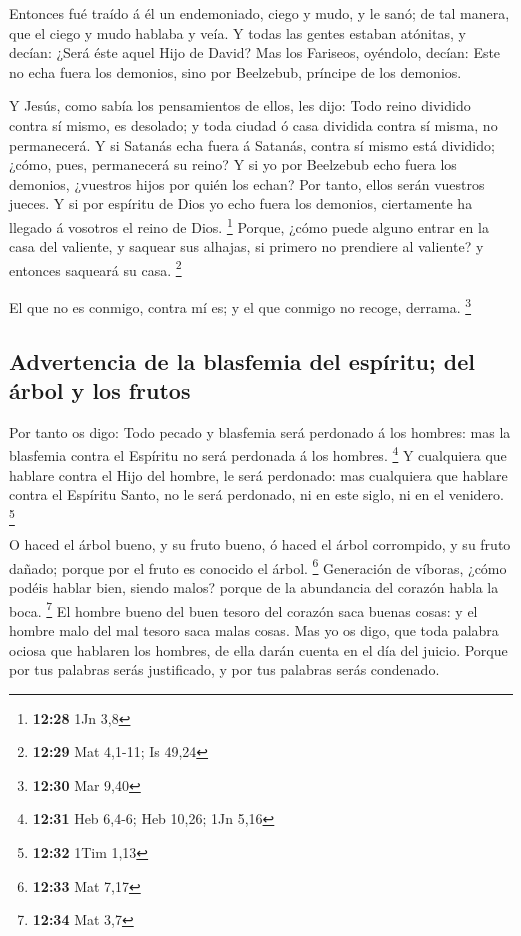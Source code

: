  Entonces fué traído á él un endemoniado, ciego y mudo, y
le sanó; de tal manera, que el ciego y mudo hablaba y veía.
 Y todas las gentes estaban atónitas, y decían: ¿Será
éste aquel Hijo de David?  Mas los Fariseos, oyéndolo,
decían: Este no echa fuera los demonios, sino por Beelzebub, príncipe de
los demonios.

 Y Jesús, como sabía los pensamientos de ellos, les dijo:
Todo reino dividido contra sí mismo, es desolado; y toda ciudad ó casa
dividida contra sí misma, no permanecerá.  Y si Satanás
echa fuera á Satanás, contra sí mismo está dividido; ¿cómo, pues,
permanecerá su reino?  Y si yo por Beelzebub echo fuera
los demonios, ¿vuestros hijos por quién los echan? Por tanto, ellos
serán vuestros jueces.  Y si por espíritu de Dios yo echo
fuera los demonios, ciertamente ha llegado á vosotros el reino de Dios.
\footnote{\textbf{12:28} 1Jn 3,8}  Porque, ¿cómo puede
alguno entrar en la casa del valiente, y saquear sus alhajas, si primero
no prendiere al valiente? y entonces saqueará su casa. \footnote{\textbf{12:29}
  Mat 4,1-11; Is 49,24}

 El que no es conmigo, contra mí es; y el que conmigo no
recoge, derrama. \footnote{\textbf{12:30} Mar 9,40}

\hypertarget{advertencia-de-la-blasfemia-del-espuxedritu-del-uxe1rbol-y-los-frutos}{%
\subsection{Advertencia de la blasfemia del espíritu; del árbol y los
frutos}\label{advertencia-de-la-blasfemia-del-espuxedritu-del-uxe1rbol-y-los-frutos}}

 Por tanto os digo: Todo pecado y blasfemia será
perdonado á los hombres: mas la blasfemia contra el Espíritu no será
perdonada á los hombres. \footnote{\textbf{12:31} Heb 6,4-6; Heb 10,26;
  1Jn 5,16}  Y cualquiera que hablare contra el Hijo del
hombre, le será perdonado: mas cualquiera que hablare contra el Espíritu
Santo, no le será perdonado, ni en este siglo, ni en el venidero.
\footnote{\textbf{12:32} 1Tim 1,13}

 O haced el árbol bueno, y su fruto bueno, ó haced el
árbol corrompido, y su fruto dañado; porque por el fruto es conocido el
árbol. \footnote{\textbf{12:33} Mat 7,17}  Generación de
víboras, ¿cómo podéis hablar bien, siendo malos? porque de la abundancia
del corazón habla la boca. \footnote{\textbf{12:34} Mat 3,7}
 El hombre bueno del buen tesoro del corazón saca buenas
cosas: y el hombre malo del mal tesoro saca malas cosas. 
Mas yo os digo, que toda palabra ociosa que hablaren los hombres, de
ella darán cuenta en el día del juicio.  Porque por tus
palabras serás justificado, y por tus palabras serás condenado.

